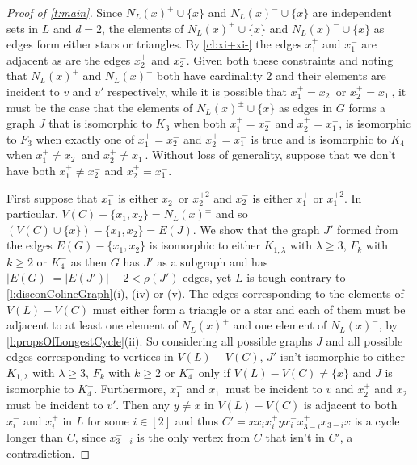 \documentclass[10pt,a4paper]{amsart}
\begin{document}
\begin{proof}[Proof of \cref{t:main}]
Since $N_L(x)^+ \cup \{x\}$ and $N_L(x)^- \cup \{x\}$ are independent sets in $L$ and $d=2$, the elements of $N_L(x)^+ \cup \{x\}$ and $N_L(x)^- \cup \{x\}$ as edges form either stars or triangles. By \cref{cl:xi+xi-} the edges $x_1^+$ and $x_1^-$ are adjacent as are the edges $x_2^+$ and $x_2^-$. Given both these constraints and noting that $N_L(x)^+$ and $N_L(x)^-$ both have cardinality 2 and their elements are incident to $v$ and $v'$ respectively, while it is possible that $x_1^+=x_2^-$ or $x_2^+=x_1^-$, it must be the case that the elements of $N_L(x)^\pm \cup \{x\}$ as edges in $G$
forms a graph $J$ that is isomorphic to $K_3$ when both $x_1^+=x_2^-$ and $x_2^+=x_1^-$, is isomorphic to $F_3$  when exactly one of $x_1^+=x_2^-$ and $x_2^+=x_1^-$ is true and is isomorphic to $K_4^-$ when $x_1^+\neq x_2^-$ and $x_2^+ \neq x_1^-$.
Without loss of generality, suppose that we don't have both $x_1^+ \neq x_2^-$ and $x_2^+=x_1^-$.

First suppose that $x_1^- $ is either $x_2^+$ or $x_2^{+2}$ and $x_2^- $ is either $x_1^+$ or $x_1^{+2}$. 
In particular, $V(C)-\{x_1,x_2\} = N_L(x)^\pm$ and so $(V(C)\cup\{x\})-\{x_1,x_2\}= E(J)$.
We show that the graph $J'$ formed from the edges $E(G)-\{x_1,x_2\}$  is isomorphic to either $K_{1,\lambda}$ with $\lambda\geq 3$, $F_k$ with $k \geq 2$ or $K_4^-$ as then $G$ has $J'$ as a subgraph and has  $|E(G)|= |E(J')|+2< \rho(J')$ edges, yet $L$ is tough contrary to \cref{l:disconColineGraph}(i), (iv) or (v).
The edges corresponding to the elements of $V(L)-V(C)$ must either form a triangle or a star and each of them must be adjacent to at least one element of $N_L(x)^+$ and one element of $N_L(x)^-$, by \cref{l:propsOfLongestCycle}(ii). 
So considering all possible graphs $J$ and all possible edges corresponding to vertices in $V(L)-V(C)$,  $J'$ isn't isomorphic to either $K_{1,\lambda}$ with $\lambda\geq 3$, $F_k$ with $k \geq 2$ or $K_4^-$ only if $V(L)-V(C) \neq \{x\}$ and %
$J$ is isomorphic to $K_4^-$. Furthermore, 
 $x_1^+$ and $x_1^-$ must be incident to $v$ and $x_2^+$ and $x_2^-$ must be incident to $v'$. 
Then any $y \neq x$ in $V(L)-V(C)$ is adjacent to both $x_i^-$ and $x_i^+$ in $L$ for some $i\in [2]$ and thus
$C' = x x_i x_{i}^+ y x_i^- x_{3-i}^+ x_{3-i} x$ is a cycle longer than $C$, since $x_{3-i}^-$ is the only vertex  from $C$ that isn't in $C'$, a contradiction.


\end{proof}
\end{document}
